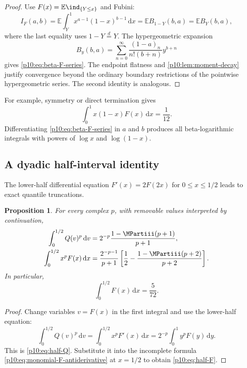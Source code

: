 \documentclass[11pt,oneside]{article}
\newtheorem{proposition}[theorem]{Proposition}
\theoremstyle{definition}
\theoremstyle{remark}
\newcommand{\F}{F}
\newcommand{\Q}{Q}
\newcommand{\E}{\mathbb E}
\newcommand{\dd}{\,\mathrm d}
\newcommand{\1}{\mathbf 1}
\begin{document}
\begin{proof}
Use \(\F(x)=\E\ind_{\{Y\le x\}}\) and Fubini:
\[
 I_F(a,b)=\E\int_Y^1x^{a-1}(1-x)^{b-1}\dd x
 =\E B_{1-Y}(b,a)=\E B_Y(b,a),
\]
where the last equality uses \(1-Y\overset d=Y\).  The hypergeometric expansion
\[
 B_y(b,a)=\sum_{n=0}^{\infty}
 \frac{(1-a)_n}{n!(b+n)}y^{b+n}
\]
gives \cref{p10:eq:beta-F-series}.  The endpoint flatness and
\cref{p10:lem:moment-decay} justify convergence beyond the ordinary boundary restrictions
of the pointwise hypergeometric series.  The second identity is analogous.
\end{proof}

For example, symmetry or direct termination gives
\begin{equation}\label{p10:eq:beta-example}
 \int_0^1x(1-x)\F(x)\dd x=\frac1{12}.
\end{equation}
Differentiating \cref{p10:eq:beta-F-series} in \(a\) and \(b\) produces all beta-logarithmic
integrals with powers of \(\log x\) and \(\log(1-x)\).

\subsection{A dyadic half-interval identity}

The lower-half differential equation \(\F'(x)=2\F(2x)\) for \(0\le x\le1/2\)
leads to exact quantile truncations.

\begin{proposition}\label{p10:prop:half-identities}
For every complex \(p\), with removable values interpreted by continuation,
\begin{align}
 \int_0^{1/2}\Q(v)^p\dd v
 &=2^{-p}\frac{1-\MPartiii(p+1)}{p+1},
 \label{p10:eq:half-Q}\\
 \int_0^{1/2}x^p\F(x)\dd x
 &=\frac{2^{-p-1}}{p+1}
 \left[\frac12-\frac{1-\MPartiii(p+2)}{p+2}\right].
 \label{p10:eq:half-F}
\end{align}
In particular,
\begin{equation}\label{p10:eq:half-F-zero}
 \int_0^{1/2}\F(x)\dd x=\frac5{72}.
\end{equation}
\end{proposition}

\begin{proof}
Change variables \(v=\F(x)\) in the first integral and use the lower-half equation:
\[
 \int_0^{1/2}\Q(v)^p\dd v
 =\int_0^{1/2}x^p\F'(x)\dd x
 =2^{-p}\int_0^1y^p\F(y)\dd y.
\]
This is \cref{p10:eq:half-Q}.  Substitute it into the incomplete formula
\cref{p10:eq:monomial-F-antiderivative} at \(x=1/2\) to obtain \cref{p10:eq:half-F}.
\end{proof}
\end{document}
